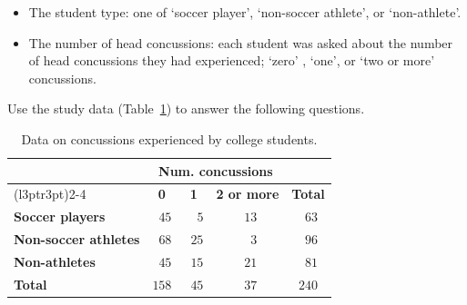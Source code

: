 \documentclass[
  11pt,
  a4paper,
  krantz2]{krantz}
\providecommand{\tightlist}{%
  \setlength{\itemsep}{0pt}\setlength{\parskip}{0pt}}
\begin{document}
\begin{itemize}
\tightlist
\item
  The student type: one of `soccer player', `non-soccer athlete', or `non-athlete'.
\item
  The number of head concussions: each student was asked about the number of head concussions they had experienced; `zero' , `one', or `two or more' concussions.
\end{itemize}

Use the study data (Table~\ref{tab:SoccerTable}) to answer the following questions.

\begin{table}
\centering
\caption{\label{tab:SoccerTable}Data on concussions experienced by college students.}
\centering
\fontsize{10}{12}\selectfont
\begin{tabular}[t]{>{}lccc>{}c}
\toprule
\multicolumn{1}{c}{\textbf{ }} & \multicolumn{3}{c}{\textbf{Num. concussions}} & \multicolumn{1}{c}{\textbf{ }} \\
\cmidrule(l{3pt}r{3pt}){2-4}
\textbf{ } & \textbf{0} & \textbf{1} & \textbf{2 or more} & \textbf{Total}\\
\midrule
\textbf{Soccer players} & $\phantom{0}45$ & $\phantom{0}\phantom{0}5$ & $\phantom{0}13$ & \textbf{$\phantom{0}63$}\\
\textbf{Non-soccer athletes} & $\phantom{0}68$ & $\phantom{0}25$ & $\phantom{0}\phantom{0}3$ & \textbf{$\phantom{0}96$}\\
\textbf{Non-athletes} & $\phantom{0}45$ & $\phantom{0}15$ & $\phantom{0}21$ & \textbf{$\phantom{0}81$}\\
\midrule
\textbf{\textbf{Total}} & \textbf{$158$} & \textbf{$\phantom{0}45$} & \textbf{$\phantom{0}37$} & \textbf{\textbf{$240$}}\\
\bottomrule
\end{tabular}
\end{table}
\end{document}
